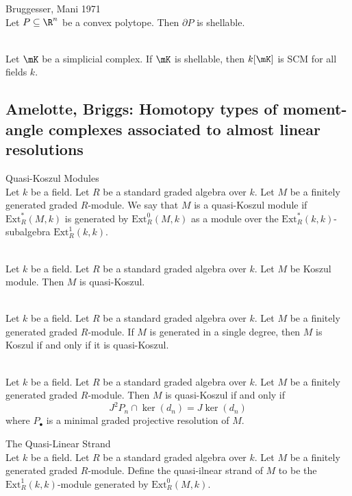 \documentclass[a4paper]{article}
\begin{document}
\begin{prp}{Bruggesser, Mani 1971}{}\\
Let $P\subseteq\R^n$ be a convex polytope. Then $\partial P$ is shellable. 
\end{prp}

\begin{prp}{}{}\\
Let $\mK$ be a simplicial complex. If $\mK$ is shellable, then $k[\mK]$ is SCM for all fields $k$. 
\end{prp}

\subsection{Amelotte, Briggs: Homotopy types of moment-angle complexes associated to almost linear resolutions}
\begin{defn}{Quasi-Koszul Modules}{}\\
Let $k$ be a field. Let $R$ be a standard graded algebra over $k$. Let $M$ be a finitely generated graded $R$-module. We say that $M$ is a quasi-Koszul module if $\text{Ext}_R^\ast(M,k)$ is generated by $\text{Ext}_R^0(M,k)$ as a module over the $\text{Ext}_R^\ast(k,k)$-subalgebra $\text{Ext}_R^1(k,k)$. 
\end{defn}

\begin{prp}{}{}\\
Let $k$ be a field. Let $R$ be a standard graded algebra over $k$. Let $M$ be Koszul module. Then $M$ is quasi-Koszul. 
\end{prp}

\begin{prp}{}{}\\
Let $k$ be a field. Let $R$ be a standard graded algebra over $k$. Let $M$ be a finitely generated graded $R$-module. If $M$ is generated in a single degree, then $M$ is Koszul if and only if it is quasi-Koszul. 
\end{prp}

\begin{prp}{}{}\\
Let $k$ be a field. Let $R$ be a standard graded algebra over $k$. Let $M$ be a finitely generated graded $R$-module. Then $M$ is quasi-Koszul if and only if $$J^2P_n\cap\ker(d_n)=J\ker(d_n)$$ where $P_\bullet$ is a minimal graded projective resolution of $M$. 
\end{prp}

\begin{defn}{The Quasi-Linear Strand}{}\\
Let $k$ be a field. Let $R$ be a standard graded algebra over $k$. Let $M$ be a finitely generated graded $R$-module. Define the quasi-ilnear strand of $M$ to be the $\text{Ext}_R^1(k,k)$-module generated by $\text{Ext}_R^0(M,k)$. 
\end{defn}
\end{document}
